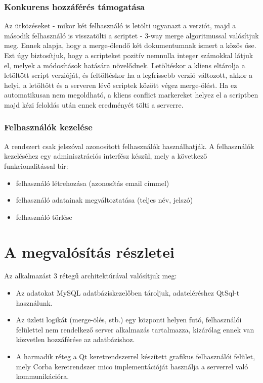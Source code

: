 \documentclass[a4paper,12pt]{article}
\begin{document}
\subsubsection{Konkurens hozzáférés támogatása}

Az ütközéseket - mikor két felhasználó is letölti ugyanazt a verziót, majd a
második felhasználó is visszatölti a scriptet - 3-way merge algoritmussal
valósítjuk meg. Ennek alapja, hogy a merge-ölendő két dokumentumnak ismert a
közös őse. Ezt úgy biztosítjuk, hogy a scripteket pozitív nemnulla integer
számokkal látjuk el, melyek a módosítások hatására növelődnek. Letöltéskor a
kliens eltárolja a letöltött script verzióját, és feltöltéskor ha a legfrissebb
verzió változott, akkor a helyi, a letöltött és a serveren lévő scriptek között
végez merge-ölést. Ha ez automatikusan nem megoldható, a kliens conflict
markereket helyez el a scriptben majd kézi feloldás után ennek eredményét tölti
a serverre.

\subsubsection{Felhasználók kezelése}

A rendszert csak jelszóval azonosított felhasználók használhatják. A
felhasználók kezeléséhez egy adminisztrációs interfész készül, mely a következő
funkcionalitással bír:

\begin{itemize}
\item felhasználó létrehozása (azonosítás email címmel)
\item felhasználó adatainak megváltoztatása (teljes név, jelszó)
\item felhasználó törlése
\end{itemize}

\section{A megvalósítás részletei}

Az alkalmazást 3 rétegű architektúrával valósítjuk meg:

\begin{itemize}
\item Az adatokat MySQL adatbáziskezelőben tároljuk, adateléréshez QtSql-t használunk.
\item Az üzleti logikát (merge-ölés, stb.) egy központi helyen futó, felhasználói
felülettel nem rendelkező server alkalmazás tartalmazza, kizárólag ennek van
közvetlen hozzáférése az adatbázishoz.
\item A harmadik réteg a Qt keretrendszerrel készített grafikus felhasználói felület,
mely Corba keretrendszer mico implementációját használja a serverrel való
kommunikációra.
\end{itemize}
\end{document}
